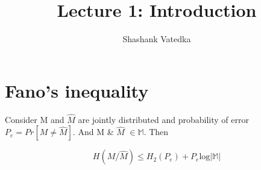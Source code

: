 \documentclass{article}
\title{Lecture 1: Introduction}
\author{Shashank Vatedka}
\begin{document}
	
	
	

\section{Fano's inequality}
Consider M and $\hat{M}$ are jointly distributed and probability of error $P_e = Pr[M \neq \hat{M}]$. And M \& $\hat{M}$
 $\in \mathbb{M}$. Then 
 
\begin{equation}
	H(M/\hat{M}) \leq H_2 (P_e ) + P_e \text{log}|\mathbb{M}|
	\end{equation}
 
\end{document}
